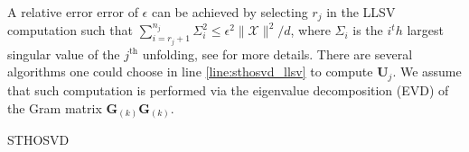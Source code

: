     A relative error error of $\epsilon$ can be achieved by selecting $r_j$ in
    the LLSV computation such that \(\sum_{i=r_j+1}^{n_j}\varSigma_i^2 \leq
    \epsilon^2 \|\mathcal{X}\|^2/d\), where $\varSigma_i$ is the $i^th$ largest
    singular value of the $j^\text{th}$ unfolding, see \cite{BK25} for more
    details. There are several algorithms one could choose in line
    \ref{line:sthosvd_llsv} to compute $\mathbf{U}_j$. We assume that such
    computation is performed via the eigenvalue decomposition (EVD) of the Gram
    matrix $\mathbf{G}_({k})\mathbf{G}_{(k)}$. 

    \begin{algorithm}
        \caption{STHOSVD}
        \label{alg:STHOSVD}
        \begin{algorithmic}
            
                    \label{line:sthosvd_llsv}  
                     
                \EndFor{}
                \vspace{10pt}
                 
                \vspace{10pt}
                 
            \EndFunction
        \end{algorithmic}
    \end{algorithm}

